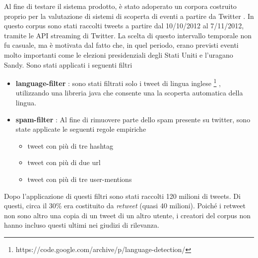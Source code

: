 Al fine di testare il sistema prodotto, è stato adoperato un corpora costruito proprio per la valutazione di sistemi
di scoperta di eventi a partire da Twitter \cite{McMinn:2013:BLC:2505515.2505695}.
In questo corpus sono stati raccolti tweets a partire dal 10/10/2012 al 7/11/2012, tramite le API streaming di Twitter.
La scelta di questo intervallo temporale non  fu casuale, ma   è motivata dal fatto che, in quel periodo, erano previsti eventi molto importanti come le elezioni presidenziali degli Stati Uniti e l'uragano Sandy.
Sono stati applicati i seguenti filtri 
\begin{itemize}
	\item \textbf{language-filter} :  sono stati filtrati solo i tweet di lingua inglese \footnote{https://code.google.com/archive/p/language-detection/}
, utilizzando una libreria java che consente una la scoperta automatica della lingua.
\item \textbf{spam-filter} : 
Al fine di rimuovere parte dello spam presente su twitter, sono state applicate le seguenti regole empiriche \cite{Benevenuto10detectingspammers}
    \begin{itemize}
	\item tweet con più di tre hashtag
	\item tweet con più di due url
	\item tweet con più di tre user-mentions
	\end{itemize}
\end{itemize}
Dopo l'applicazione di questi filtri sono stati raccolti 120 milioni di tweets.
Di questi, circa il 30\% era costituito da  \emph{retweet} (quasi 40 milioni). Poiché i retweet non sono  altro una copia di un tweet di un altro utente, i creatori del corpus non hanno incluso questi ultimi nei giudizi di rilevanza. 


